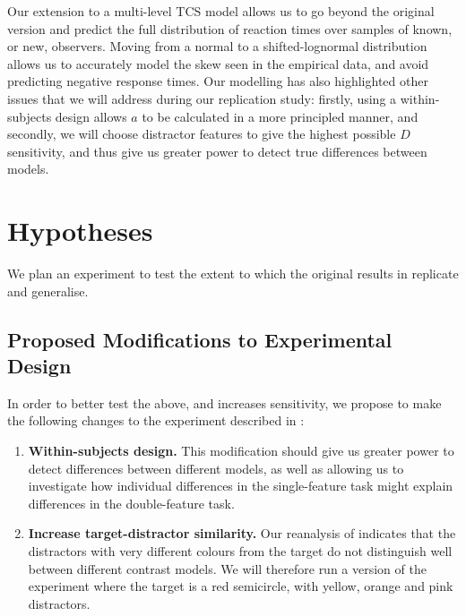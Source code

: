 \documentclass[preprint,12pt,authoryear]{elsarticle}
\begin{document}
Our extension to a multi-level TCS model allows us to go beyond the original version and predict the full distribution of reaction times over samples of known, or new, observers. Moving from a normal to a shifted-lognormal distribution allows us to accurately model the skew seen in the empirical data, and avoid predicting negative response times. Our modelling has also highlighted other issues that we will address during our replication study: firstly, using a within-subjects design allows $a$ to be calculated in a more principled manner, and secondly, we will choose distractor features to give the highest possible $D$ sensitivity, and thus give us greater power to detect true differences between models.

\section{Hypotheses}

We plan an experiment to test the extent to which the original results in \cite{buetti2019predicting} replicate and generalise.

\subsection{Proposed Modifications to Experimental Design}

In order to better test the above, and increases sensitivity, we propose to make the following changes to the experiment described in \cite{buetti2019predicting}:

\begin{enumerate}
\item \textbf{Within-subjects design.} This modification should give us greater power to detect differences between different models, as well as allowing us to investigate how individual differences in the single-feature task might explain differences in the double-feature task.
\\
\item \textbf{Increase target-distractor similarity.} Our reanalysis of \cite{buetti2019predicting} indicates that the distractors with very different colours from the target do not distinguish well between different contrast models. We will therefore run a version of the experiment where the target is a red semicircle, with yellow, orange and pink distractors.
\\


\end{enumerate}
\end{document}
